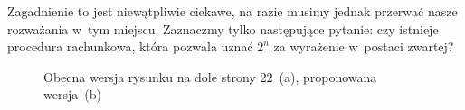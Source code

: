 \documentclass[a4paper,11pt]{article}
\numberwithin{equation}{section}
\newtheorem{corollary}{Wniosek}
\newtheorem{theorem}{Twierdzenie}
\begin{document}
Zagadnienie to jest niewątpliwie ciekawe, na razie musimy jednak przerwać
nasze rozważania w~tym miejscu. Zaznaczmy tylko następujące pytanie:
czy istnieje procedura rachunkowa, która pozwala uznać $2^{ n }$ za
wyrażenie w~postaci zwartej?








\begin{figure}[h]

  \label{fig:Leja-Funkcje-zespolone-01}

  \centering



  \caption{Obecna wersja rysunku na dole strony 22~(a), proponowana
    wersja~(b)}


\end{figure}

























\end{document}
